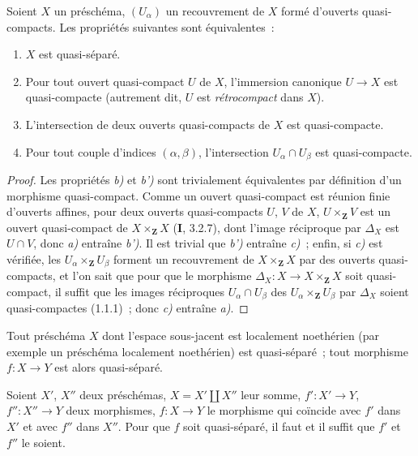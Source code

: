 \begin{proposition}[1.2.7]
\label{IV.1.2.7-fr}
Soient $X$ un préschéma, $(U_\alpha)$ un recouvrement de $X$ formé d'ouverts
quasi-compacts. Les propriétés suivantes sont équivalentes~:
\begin{enumerate}
  \item[\textup{a)}] $X$ est quasi-séparé.
  \item[\textup{b)}] Pour tout ouvert quasi-compact $U$ de $X$, l'immersion canonique
  $U\to X$ est quasi-compacte \textup{(autrement dit, $U$ est \emph{rétrocompact} dans $X$)}.
  \item[\textup{b')}] L'intersection de deux ouverts quasi-compacts de $X$ est
  quasi-compacte.
  \item[\textup{c)}] Pour tout couple d'indices $(\alpha,\beta)$, l'intersection
  $U_\alpha\cap U_\beta$ est quasi-compacte.
\end{enumerate}
\end{proposition}

\begin{proof}
Les propriétés \emph{b)} et \emph{b')} sont trivialement équivalentes par
définition d'un morphisme quasi-compact. Comme un ouvert quasi-compact est
réunion finie d'ouverts affines, pour deux ouverts quasi-compacts $U$, $V$ de
$X$, $U\times_{\mathbf Z}V$ est un ouvert quasi-compact de
$X\times_{\mathbf Z}X$ (\textbf{I}, 3.2.7), dont l'image réciproque par $\Delta_X$ est
$U\cap V$, donc \emph{a)} entraîne \emph{b')}. Il est trivial que \emph{b')}
entraîne \emph{c)}~; enfin, si \emph{c)} est vérifiée, les
$U_\alpha\times_{\mathbf Z}U_\beta$ forment un recouvrement de
$X\times_{\mathbf Z}X$ par des ouverts quasi-compacts, et l'on sait que pour
que le morphisme $\Delta_X:X\to X\times_{\mathbf Z}X$ soit quasi-compact, il
suffit que les images réciproques $U_\alpha\cap U_\beta$ des
$U_\alpha\times_{\mathbf Z}U_\beta$ par $\Delta_X$ soient quasi-compactes
(1.1.1)~; donc \emph{c)} entraîne \emph{a)}.
\end{proof}

\begin{corollary}[1.2.8]
\label{IV.1.2.8-fr}
Tout préschéma $X$ dont l'espace sous-jacent est localement noethérien (par
exemple un préschéma localement noethérien) est quasi-séparé~; tout morphisme
$f:X\to Y$ est alors quasi-séparé.
\end{corollary}

\begin{proposition}[1.2.9]
\label{IV.1.2.9-fr}
Soient $X'$, $X''$ deux préschémas, $X=X'\coprod X''$ leur somme,
$f':X'\to Y$, $f'':X''\to Y$ deux morphismes, $f:X\to Y$ le morphisme qui
coïncide avec $f'$ dans $X'$ et avec $f''$ dans $X''$. Pour que $f$ soit
quasi-séparé, il faut et il suffit que $f'$ et $f''$ le soient.
\end{proposition}


